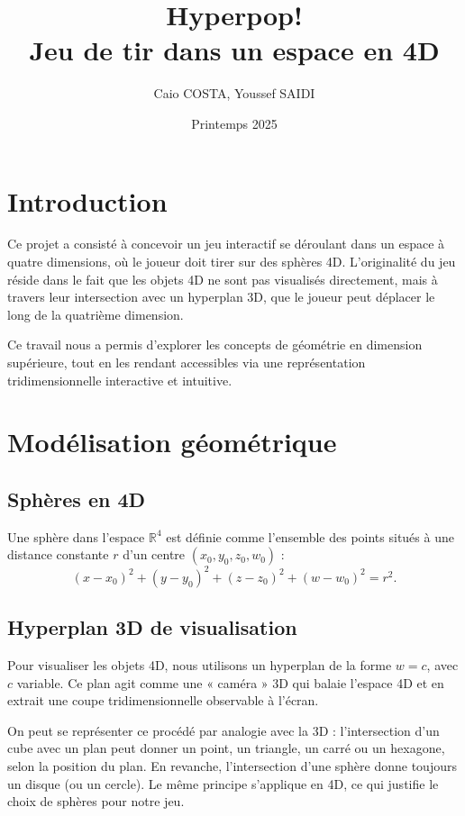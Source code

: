 \documentclass[11pt,a4paper]{article}
\title{Hyperpop! \\ \normalsize{Jeu de tir dans un espace en 4D}}
\author{Caio COSTA, Youssef SAIDI}
\date{Printemps 2025}
\begin{document}
\maketitle

\tableofcontents

\section{Introduction}

Ce projet a consisté à concevoir un jeu interactif se déroulant dans un espace à quatre dimensions, où le joueur doit tirer sur des sphères 4D. L’originalité du jeu réside dans le fait que les objets 4D ne sont pas visualisés directement, mais à travers leur intersection avec un hyperplan 3D, que le joueur peut déplacer le long de la quatrième dimension.

Ce travail nous a permis d'explorer les concepts de géométrie en dimension supérieure, tout en les rendant accessibles via une représentation tridimensionnelle interactive et intuitive.

\section{Modélisation géométrique}

\subsection{Sphères en 4D}

Une sphère dans l’espace $\mathbb{R}^4$ est définie comme l’ensemble des points situés à une distance constante $r$ d’un centre $(x_0, y_0, z_0, w_0)$ :
\[
	(x - x_0)^2 + (y - y_0)^2 + (z - z_0)^2 + (w - w_0)^2 = r^2.
\]

\subsection{Hyperplan 3D de visualisation}

Pour visualiser les objets 4D, nous utilisons un hyperplan de la forme $w = c$, avec $c$ variable. Ce plan agit comme une « caméra » 3D qui balaie l’espace 4D et en extrait une coupe tridimensionnelle observable à l’écran.

On peut se représenter ce procédé par analogie avec la 3D : l’intersection d’un cube avec un plan peut donner un point, un triangle, un carré ou un hexagone, selon la position du plan. En revanche, l’intersection d’une sphère donne toujours un disque (ou un cercle). Le même principe s’applique en 4D, ce qui justifie le choix de sphères pour notre jeu.
\end{document}
